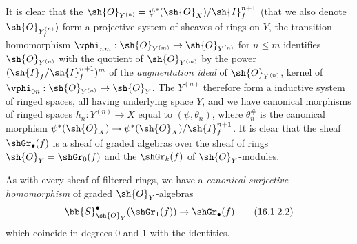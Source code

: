It is clear that the $\sh{O}_{Y^{(n)}} = \psi^*(\sh{O}_X)/\sh{I}_f^{n+1}$ (that we also denote $\sh{O}_{Y_f^{(n)}})$ form a
projective system of sheaves of rings on $Y$, the transition homomorphism $\vphi_{nm}:\sh{O}_{Y^{(m)}} \to \sh{O}_{Y^{(n)}}$ for $n \leq m$ identifies $\sh{O}_{Y^{(n)}}$ with the quotient of $\sh{O}_{Y^{(m)}}$ by the power $(\sh{I}_f/\sh{I}_f^{n+1} )^m$ of the \emph{augmentation ideal} of $\sh{O}_{Y^{(n)}}$, kernel of $\vphi_{0n}: \sh{O}_{Y^{(n)}} \to \sh{O}_{Y}$.
The $Y^{(n)}$ therefore form a inductive system of ringed spaces, all having underlying space $Y$, and we have canonical morphisms of ringed spaces $h_n: Y^{(n)} \to X$ equal to $(\psi, \theta_n)$, where $\theta^\#_n$ is the canonical morphism $\psi^*(\sh{O}_X) \to \psi^*(\sh{O}_X)/\sh{I}_f^{n+1}$.
It is clear that the sheaf $\shGr_\bullet(f)$ is a sheaf of graded algebras over the sheaf of rings $\sh{O}_Y = \shGr_0(f)$ and the $\shGr_k(f)$ of $\sh{O}_Y$-modules.

As with every sheaf of filtered rings, we have a \emph{canonical surjective homomorphism} of graded $\sh{O}_Y$-algebras
\[
  \label{IV.16.1.2.2}
  \bb{S}_{\sh{O}_Y}^\bullet(\shGr_1(f)) \to \shGr_\bullet(f)
  \tag{16.1.2.2}
\]
which coincide in degrees $0$ and $1$ with the identities.

